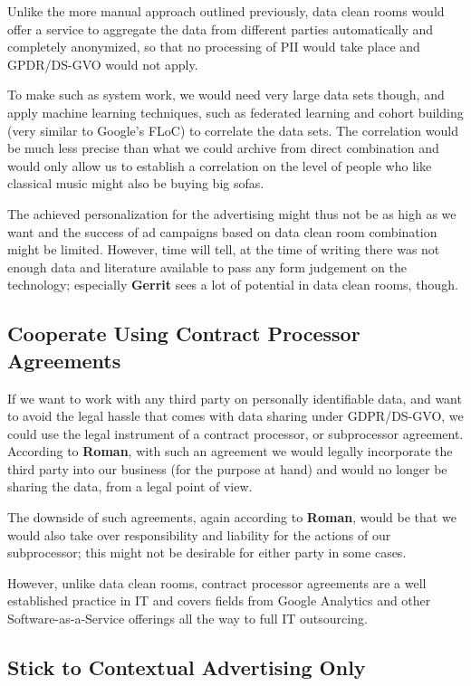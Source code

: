 Unlike the more manual approach outlined previously, data clean rooms would offer a service to aggregate the data from different parties automatically and completely anonymized, so that no processing of PII would take place and GPDR/DS-GVO would not apply.

To make such as system work, we would need very large data sets though, and apply machine learning techniques, such as federated learning and cohort building (very similar to Google's FLoC) to correlate the data sets. The correlation would be much less precise than what we could archive from direct combination and would only allow us to establish a correlation on the level of people who like classical music might also be buying big sofas.

The achieved personalization for the advertising might thus not be as high as we want and the success of ad campaigns based on data clean room combination might be limited. However, time will tell, at the time of writing there was not enough data and literature available to pass any form judgement on the technology; especially \textbf{Gerrit} sees a lot of potential in data clean rooms, though.

\subsection{Cooperate Using Contract Processor Agreements}

If we want to work with any third party on personally identifiable data, and want to avoid the legal hassle that comes with data sharing under GDPR/DS-GVO, we could use the legal instrument of a contract processor, or subprocessor agreement. According to \textbf{Roman}, with such an agreement we would legally incorporate the third party into our business (for the purpose at hand) and would no longer be sharing the data, from a legal point of view.

The downside of such agreements, again according to \textbf{Roman}, would be that we would also take over responsibility and liability for the actions of our subprocessor; this might not be desirable for either party in some cases.

However, unlike data clean rooms, contract processor agreements are a well established practice in IT and covers fields from Google Analytics and other Software-as-a-Service offerings all the way to full IT outsourcing.

\subsection{Stick to Contextual Advertising Only}

